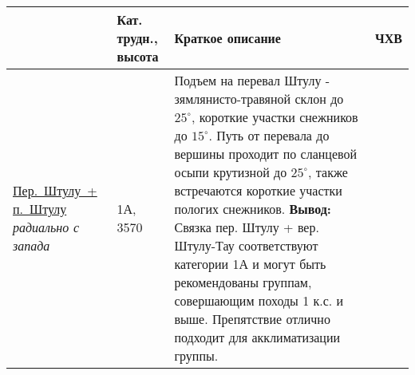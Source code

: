 		 \begin{longtable}{|>{\centering\arraybackslash}m{4.5cm}|>{\centering\arraybackslash}m{1.8cm}|>{\raggedright\arraybackslash}m{9.6cm}|>{\centering\arraybackslash}m{1.2cm}|} \hline
		 	{Препятствие}																																					&	{Кат. трудн., высота}		&	{Краткое описание}																																																																																																																																																																																																																																																																																																																																												&	{ЧХВ}	\\ \hline
		 	\hyperref[subsec:Day2]{{\small Пер.~Штулу~+ п.~Штулу}}														\newline\textit{радиально с запада}		&	1А, 3570					&	{\small Подъем на перевал Штулу - зямлянисто-травяной склон до $25^\circ$, короткие участки снежников до $15^\circ$. Путь от перевала до вершины проходит по сланцевой осыпи крутизной до $25^\circ$, также встречаются короткие участки пологих снежников.} \newline \textbf{Вывод:} {\small Связка пер. Штулу + вер. Штулу-Тау соответствуют категории 1А и могут быть рекомендованы группам, совершающим походы 1 к.с. и выше. Препятствие отлично подходит для акклиматизации группы.} 																																																																																																																																																																																																																																																																																	&			\\ \hline

\end{longtable}
